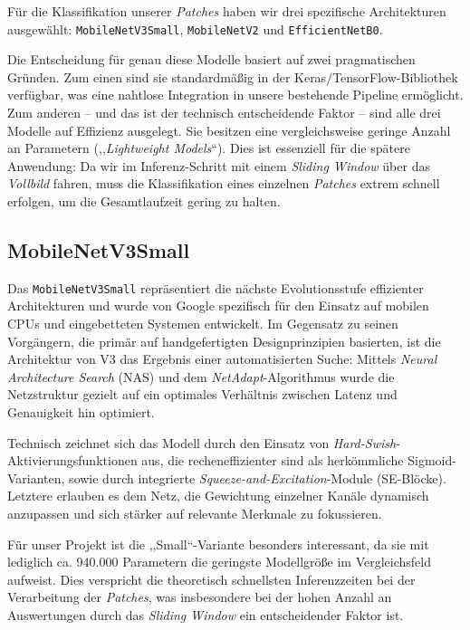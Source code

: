 \documentclass[
    a4paper,        %
    11pt,           %
    ngerman,        %
    parskip=half,   %
    listof=totoc,   %
    bibliography=totoc %
]{scrartcl}
\begin{document}
Für die Klassifikation unserer \textit{Patches} haben wir drei spezifische Architekturen ausgewählt: \texttt{MobileNetV3Small}, \texttt{MobileNetV2} und \texttt{EfficientNetB0}.

Die Entscheidung für genau diese Modelle basiert auf zwei pragmatischen Gründen. Zum einen sind sie standardmäßig in der Keras/TensorFlow-Bibliothek verfügbar, was eine nahtlose Integration in unsere bestehende Pipeline ermöglicht. Zum anderen – und das ist der technisch entscheidende Faktor – sind alle drei Modelle auf Effizienz ausgelegt. Sie besitzen eine vergleichsweise geringe Anzahl an Parametern (,,\textit{Lightweight Models}``). Dies ist essenziell für die spätere Anwendung: Da wir im Inferenz-Schritt mit einem \textit{Sliding Window} über das \textit{Vollbild} fahren, muss die Klassifikation eines einzelnen \textit{Patches} extrem schnell erfolgen, um die Gesamtlaufzeit gering zu halten.

\subsection{MobileNetV3Small}

Das \texttt{MobileNetV3Small} repräsentiert die nächste Evolutionsstufe effizienter Architekturen und wurde von Google spezifisch für den Einsatz auf mobilen CPUs und eingebetteten Systemen entwickelt. Im Gegensatz zu seinen Vorgängern, die primär auf handgefertigten Designprinzipien basierten, ist die Architektur von V3 das Ergebnis einer automatisierten Suche: Mittels \textit{Neural Architecture Search} (NAS) und dem \textit{NetAdapt}-Algorithmus wurde die Netzstruktur gezielt auf ein optimales Verhältnis zwischen Latenz und Genauigkeit hin optimiert.

Technisch zeichnet sich das Modell durch den Einsatz von \textit{Hard-Swish}-Aktivierungsfunktionen aus, die recheneffizienter sind als herkömmliche Sigmoid-Varianten, sowie durch integrierte \textit{Squeeze-and-Excitation}-Module (SE-Blöcke). Letztere erlauben es dem Netz, die Gewichtung einzelner Kanäle dynamisch anzupassen und sich stärker auf relevante Merkmale zu fokussieren.

Für unser Projekt ist die ,,Small``-Variante besonders interessant, da sie mit lediglich ca. 940.000 Parametern die geringste Modellgröße im Vergleichsfeld aufweist. Dies verspricht die theoretisch schnellsten Inferenzzeiten bei der Verarbeitung der \textit{Patches}, was insbesondere bei der hohen Anzahl an Auswertungen durch das \textit{Sliding Window} ein entscheidender Faktor ist.
\end{document}
